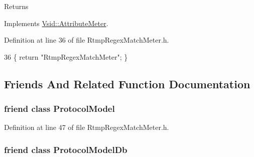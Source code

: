 \begin{DoxyReturn}{Returns}

\end{DoxyReturn}


Implements \hyperlink{class_vsid_1_1_attribute_meter_a24d5a7141e89e948c05edf8f70be8c53}{Vsid\-::\-Attribute\-Meter}.



Definition at line 36 of file Rtmp\-Regex\-Match\-Meter.\-h.


\begin{DoxyCode}
36 \{ \textcolor{keywordflow}{return} \textcolor{stringliteral}{"RtmpRegexMatchMeter"}; \}
\end{DoxyCode}


\subsection{Friends And Related Function Documentation}
\hypertarget{class_vsid_1_1_rtmp_regex_match_meter_a80219b863d4ff3456933d16bc5f73f45}{
\subsubsection[{Protocol\-Model}]{\setlength{\rightskip}{0pt plus 5cm}friend class {\bf Protocol\-Model}\hspace{0.3cm}{\ttfamily [friend]}}}\label{class_vsid_1_1_rtmp_regex_match_meter_a80219b863d4ff3456933d16bc5f73f45}


Definition at line 47 of file Rtmp\-Regex\-Match\-Meter.\-h.

\hypertarget{class_vsid_1_1_rtmp_regex_match_meter_a3c0d389e7a9476b06313d8fb9ca9fe68}{
\subsubsection[{Protocol\-Model\-Db}]{\setlength{\rightskip}{0pt plus 5cm}friend class {\bf Protocol\-Model\-Db}\hspace{0.3cm}{\ttfamily [friend]}}}\label{class_vsid_1_1_rtmp_regex_match_meter_a3c0d389e7a9476b06313d8fb9ca9fe68}


